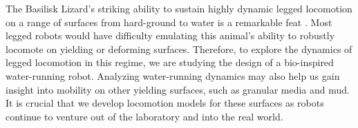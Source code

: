 The Basilisk Lizard's striking ability to sustain highly dynamic legged locomotion on a range of surfaces from hard-ground to water is a remarkable feat \cite{glasheen1996hydrodynamic}. Most legged robots would have difficulty emulating this animal's ability to robustly locomote on yielding or deforming surfaces. Therefore, to explore the dynamics of legged locomotion in this regime, we are studying the design of a bio-inspired water-running robot. Analyzing water-running dynamics may also help us gain insight into mobility on other yielding surfaces, such as granular media and mud. It is crucial that we develop locomotion models for these surfaces as robots continue to venture out of the laboratory and into the real world.
